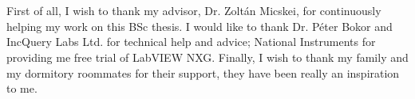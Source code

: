 \chapter*{\koszonetnyilvanitas}



First of all, I wish to thank my advisor, Dr. Zoltán Micskei, for continuously helping my work on this BSc thesis. I would like to thank Dr. Péter Bokor and IncQuery Labs Ltd. for technical help and advice; National Instruments for providing me free trial of LabVIEW NXG. Finally, I wish to thank my family and my dormitory roommates for their support, they have been really an inspiration to me.